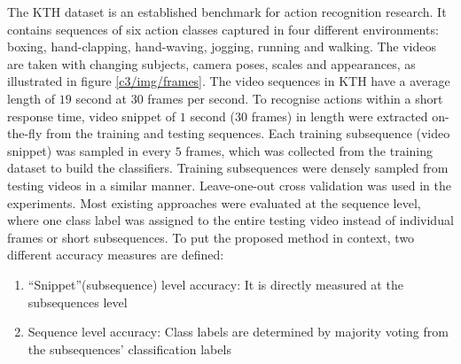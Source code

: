 The KTH dataset is an established benchmark for action recognition research. 
It contains sequences of six action classes captured in four different environments: boxing, hand-clapping, hand-waving, jogging, running and walking. 
The videos are taken with changing subjects, camera poses, scales and appearances, as illustrated in figure \ref{c3/img/frames}. 
The video sequences in KTH have a average length of $19$ second at $30$ frames per second. 
To recognise actions within a short response time, video snippet of $1$ second ($30$ frames) in length were extracted on-the-fly from the training and testing sequences. 
Each training subsequence (video snippet) was sampled in every $5$ frames, which was collected from the training dataset to build the classifiers. 
Training subsequences were densely sampled from testing videos in a similar manner. 
Leave-one-out cross validation was used in the experiments. 
Most existing approaches were evaluated at the sequence level, where one class label was assigned to the entire testing video instead of individual frames or short subsequences. 
To put the proposed method in context, two different accuracy measures are defined: 
\begin{enumerate}
\item ``Snippet''(subsequence) level accuracy: It is directly measured at the subsequences level 
\item Sequence level accuracy: Class labels are determined by majority voting from the subsequences' classification labels 
\end{enumerate}

